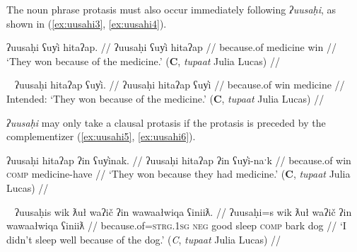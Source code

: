 The noun phrase protasis must also occur immediately following \textit{ʔuusaḥi}, as shown in (\ref{ex:uusahi3}, \ref{ex:uusahi4}).

\ex \label{ex:uusahi3}
\begingl
\glpreamble ʔuusaḥi ʕuy̓i hitaʔap. //
\gla ʔuusaḥi ʕuy̓i hitaʔap //
\glb because.of medicine win //
\glft `They won because of the medicine.' (\textbf{C}, \textit{tupaat} Julia Lucas) //
\endgl
\xe

\ex~ \label{ex:uusahi4}
\begingl
\glpreamble *ʔuusaḥi hitaʔap ʕuy̓i. //
\gla ʔuusaḥi hitaʔap ʕuy̓i //
\glb because.of win medicine //
\glft Intended: `They won because of the medicine.' (\textbf{C}, \textit{tupaat} Julia Lucas) //
\endgl
\xe

\textit{ʔuusaḥi} may only take a clausal protasis if the protasis is preceded by the complementizer (\ref{ex:uusahi5}, \ref{ex:uusahi6}).

\ex \label{ex:uusahi5}
\begingl
\glpreamble ʔuusaḥi hitaʔap ʔin ʕuy̓inak. //
\gla ʔuusaḥi hitaʔap ʔin ʕuy̓i-naˑk //
\glb because.of win \textsc{comp} medicine-have  //
\glft `They won because they had medicine.' (\textbf{C}, \textit{tupaat} Julia Lucas) //
\endgl
\xe

\ex~ \label{ex:uusahi6}
\begingl
\glpreamble ʔuusaḥis wik ƛuł waʔič ʔin wawaałwiqa ʕiniiƛ. //
\gla ʔuusaḥi=s wik ƛuł waʔič ʔin wawaałwiqa ʕiniiƛ //
\glb because.of=\textsc{strg.1sg} \textsc{neg} good sleep \textsc{comp} bark dog  //
\glft `I didn't sleep well because of the dog.' (\textit{C}, \textit{tupaat} Julia Lucas) //
\endgl
\xe

\begin{comment}
[[TODO: uusahi plus linker ]]
\textit{ʔuusaḥi} may only be able to take the linker when it is non-initial. Both consultants with whom I attempted to add a linker to an ʔuusaḥi-initial sentence were uncertain if it was okay or not but felt it was weird (\ref{ex:uusahi7}, \ref{ex:uusahi8}).

\ex \label{ex:uusahi7}
\begingl
\glpreamble ?? ʔuusaḥiqḥita nay̓aqakʔi wikitaḥ ƛuł weʔič. //
\gla ʔuusaḥi-(q)ḥ=(m)it=(m)aˑ nay̓aqak=ʔiˑ wik=(m)it=(m)aˑḥ ƛuł weʔič //
\glb because.of-\textsc{link}=\textsc{pst}=\textsc{real.3} baby=\textsc{art} \textsc{neg}=\textsc{pst}=\textsc{real.1sg} good sleep //
\glft Intended: `I didn't sleep well because of the baby.' (\textbf{B}, Bob Mundy) //
\endgl
\xe

*? ʔuusaḥiqḥʔiš ʔuusaqta wik̓aałukʷint

ʔuusaqtumtʔiš ʔuusaḥiqḥ wik̓aałukʷint
\end{comment}

